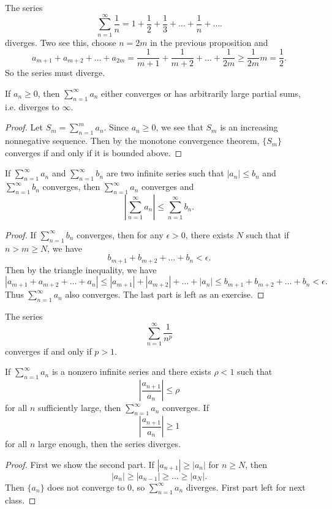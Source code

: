 \begin{example}
  The series
  \[
    \sum_{n = 1}^\infty \frac{1}{n} = 1 + \frac{1}{2} + \frac{1}{3} + \dots + \frac{1}{n} + \dots.
  \]
  diverges. Two see this, choose $n = 2m$ in the
  previous proposition and
  \[
    a_{m + 1} + a_{m + 2} + \dots + a_{2m}
    = \frac{1}{m + 1} + \frac{1}{m + 2} + \dots + \frac{1}{2m}
    \ge \frac{1}{2m} m = \frac{1}{2}.
  \]
  So the series must diverge.
\end{example}

\begin{prop}
  If $a_n \ge 0$, then
  $\sum_{n = 1}^\infty a_n$ either converges or
  has arbitrarily large partial sums, i.e. diverges to $\infty$.
\end{prop}

\begin{proof}
  Let $S_m = \sum_{n = 1}^m a_n$. Since $a_n \ge 0$,
  we see that $S_m$ is an increasing nonnegative sequence.
  Then by the monotone convergence theorem,
  $\{S_m\}$ converges if and only if it is bounded above.
\end{proof}

\begin{prop}
  If $\sum_{n = 1}^\infty a_n$ and $\sum_{n = 1}^\infty b_n$
  are two infinite series such that
  $|a_n| \le b_n$ and $\sum_{n = 1}^\infty b_n$ converges,
  then $\sum_{n = 1}^\infty a_n$ converges and
  \[
    \left| \sum_{n = 1}^\infty a_n \right| \le \sum_{n = 1}^\infty b_n.
  \]
\end{prop}

\begin{proof}
  If $\sum_{n = 1}^\infty b_n$ converges, then
  for any $\epsilon > 0$, there exists $N$ such that
  if $n > m \ge N$, we have
  \[
    b_{m + 1} + b_{m + 2} + \dots + b_n < \epsilon.
  \]
  Then by the triangle inequality, we have
  \[
    |a_{m + 1} + a_{m + 2} + \dots + a_n|
    \le |a_{m + 1}| + |a_{m + 2}| + \dots + |a_n|
    \le b_{m + 1} + b_{m + 2} + \dots + b_n < \epsilon.
  \]
  Thus $\sum_{n = 1}^\infty a_n$ also converges.
  The last part is left as an exercise.
\end{proof}

\begin{example}[$p$-series]
  The series
  \[
    \sum_{n = 1}^\infty \frac{1}{n^p}
  \]
  converges if and only if $p > 1$.
\end{example}

\begin{prop}
  If $\sum_{n = 1}^\infty a_n$ is a nonzero infinite
  series and
  there exists $\rho < 1$ such that
  \[
    \left| \frac{a_{n + 1}}{a_n} \right| \le \rho
  \]
  for all $n$ sufficiently large, then
  $\sum_{n = 1}^\infty a_n$ converges. If
  \[
    \left| \frac{a_{n + 1}}{a_n} \right| \ge 1
  \]
  for all $n$ large enough, then the series diverges.
\end{prop}

\begin{proof}
  First we show the second part. If
  $|a_{n + 1}| \ge |a_n|$ for $n \ge N$, then
  \[|a_n| \ge |a_{n - 1}| \ge \dots \ge |a_N|.\]
  Then $\{a_n\}$ does not converge to $0$, so
  $\sum_{n = 1}^\infty a_n$ diverges.
  First part left for next class.
\end{proof}
